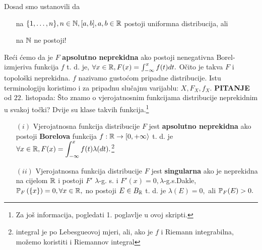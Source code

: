 \documentclass{article}
\begin{document}
Dosad smo ustanovili da 
\begin{itemize}
    \item[\ding{113}] na \(\{1,\ldots,n\},n\in\Bbb N,[a,b],a,b\in\Bbb R\) postoji uniformna distribucija, ali
    \item[\ding{113}] na \(\Bbb N\) ne postoji!
\end{itemize}
Reći ćemo da je \(F\) \textbf{apsolutno neprekidna} ako postoji nenegativna Borel-izmjeriva funkcija \(f\) t. d. je, \(\forall x\in\Bbb R, F(x)=\int_{-\infty}^xf(t)dt.\) Očito je takva \(F\) i topološki neprekidna. \(f\) nazivamo gustoćom pripadne distribucije. Istu terminologiju koristimo i za pripadnu slučajnu varijablu: \(X, F_X,f_X.\)\newline\newline
\textbf{PITANJE} od \(22.\) listopada: Što znamo o vjerojatnosnim funkcijama distribucije neprekidnim u svakoj točki? Dvije su klase takvih funkcija.\footnote[51]{Za još informacija, pogledati 1. poglavlje u ovoj skripti.}
\begin{enumerate}
    \item[\((i)\)] Vjerojatnosna funkcija distribucije \(F\) jest \textbf{apsolutno neprekidna} ako postoji \textbf{Borelova} funkcija \(f:\Bbb R\to[0,+\infty\rangle\) t. d. je \(\forall x\in\Bbb R, \displaystyle F(x)=\int_{-\infty}^xf(t)\lambda(dt).\)\footnote[52]{integral je po Lebesgueovoj mjeri, ali, ako je \(f\) i Riemann integrabilna, možemo koristiti i Riemannov integral} 
    \item[\((ii)\)] Vjerojatnosna funkcija distribucije \(F\) jest \textbf{singularna} ako je neprekidna na cijelom \(\Bbb R\) i postoji \(F'\) \(\lambda\)-g. s. i \(F'(x)=0,\lambda\)-g.s.\newline Dakle, \(\Bbb P_F\left(\{x\}\right)=0,\forall x\in\Bbb R,\) no postoji \(E\in B_\Bbb R\) t. d. je \(\lambda(E)=0,\) ali \(\Bbb P_F(E)>0.\) 
\end{enumerate}
\newpage
\end{document}
